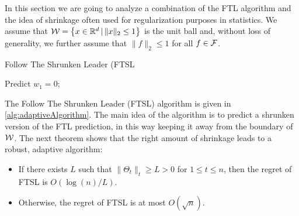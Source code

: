 In this section we are going to analyze a combination of the FTL algorithm and the idea of shrinkage often used for regularization purposes in statistics. We assume that $\mathcal{W}=\left\{x \in \mathbb{R}^d \,\vert\,  \|x\|_2 \le 1 \right\}$ is the unit ball and,  without loss of generality, we further assume that $\|f\|_2 \le 1$ for all $f\in\mathcal{F}$. 
	\begin{algorithm}[t]
		\caption{Follow The Shrunken Leader (FTSL}
		\label{alg:adaptiveAlgorithm}
		\begin{algorithmic}[1]
			\STATE Predict $w_1 = 0$; 
			\ENDFOR
		\end{algorithmic}
	\end{algorithm}
\begin{thm}
 
 The Follow The Shrunken Leader (FTSL) algorithm is given in \cref{alg:adaptiveAlgorithm}. The main idea of the algorithm is to predict a shrunken version of the FTL prediction, in this way keeping it away from the boundary of $\mathcal{W}$. The next theorem shows that the right amount of shrinkage leads to a robust, adaptive algorithm:
  \begin{itemize}
 	\item If there exists $L$ such that $\|\Theta_t\|_t \ge L>0$ for $1\le t\le n$, then the regret of FTSL is $O(\log(n)/L)$.
 	\item Otherwise, the regret of FTSL is at most $O(\sqrt{n})$.
 \end{itemize}
\end{thm}
